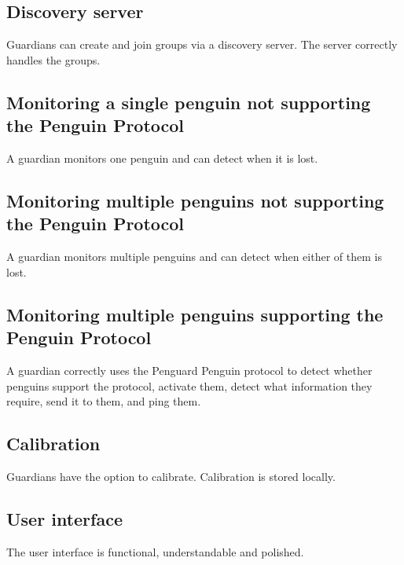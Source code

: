 \documentclass{report}
\begin{document}
\subsection{Discovery server}

Guardians can create and join groups via a discovery server. The server correctly handles the groups.

\subsection{Monitoring a single penguin not supporting the Penguin Protocol}

A guardian monitors one penguin and can detect when it is lost. 

\subsection{Monitoring multiple penguins not supporting the Penguin Protocol}

A guardian monitors multiple penguins and can detect when either of them is lost. 

\subsection{Monitoring multiple penguins supporting the Penguin Protocol}

A guardian correctly uses the Penguard Penguin protocol to detect whether penguins support the protocol, activate them, detect what information they require, send it to them, and ping them.

\subsection{Calibration}

Guardians have the option to calibrate. Calibration is stored locally.

\subsection{User interface}

The user interface is functional, understandable and polished.


\end{document}
